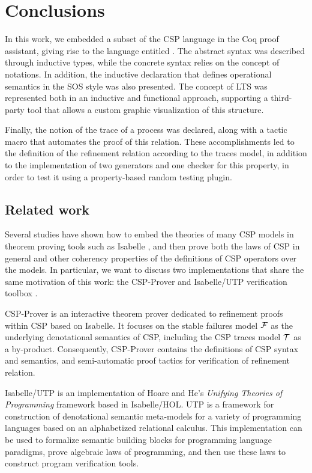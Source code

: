 \chapter{Conclusions}

In this work, we embedded a subset of the CSP language in the Coq proof assistant, giving rise to the language entitled \CSPcoq{}. The abstract syntax was described through inductive types, while the concrete syntax relies on the concept of notations. In addition, the inductive declaration that defines operational semantics in the SOS style was also presented. The concept of LTS was represented both in an inductive and functional approach, supporting a third-party tool that allows a custom graphic visualization of this structure.

Finally, the notion of the trace of a process was declared, along with a tactic macro that automates the proof of this relation. These accomplishments led to the definition of the refinement relation according to the traces model, in addition to the implementation of two generators and one checker for this property, in order to test it using a property-based random testing plugin.

\section{Related work}

Several studies have shown how to embed the theories of many CSP models in theorem proving tools such as Isabelle \cite{Paulson:Isabelle}, and then prove both the laws of CSP in general and other coherency properties of the definitions of CSP operators over the models. In particular, we want to discuss two implementations that share the same motivation of this work: the CSP-Prover \cite{Roggenbach:CSP-Prover} and Isabelle/UTP verification toolbox \cite{Woodcock:Isabelle/UTP}.

CSP-Prover is an interactive theorem prover dedicated to refinement proofs within CSP based on Isabelle. It focuses on the stable failures model $ \fmodel $ as the underlying denotational semantics of CSP, including the CSP traces model $ \tmodel $ as a by-product. Consequently, CSP-Prover contains the definitions of CSP syntax and semantics, and semi-automatic proof tactics for verification of refinement relation.

Isabelle/UTP is an implementation of Hoare and He's \emph{Unifying Theories of Programming} framework based in Isabelle/HOL. UTP is a framework for construction of denotational semantic meta-models for a variety of programming languages based on an alphabetized relational calculus. This implementation can be used to formalize semantic building blocks for programming language paradigms, prove algebraic laws of programming, and then use these laws to construct program verification tools.


